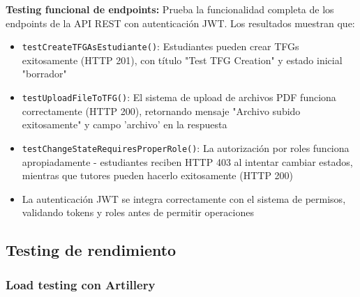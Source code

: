 \documentclass[12pt,a4paper,oneside]{report}
\begin{document}
\textbf{Testing funcional de endpoints:} Prueba la funcionalidad completa de los endpoints de la API REST con autenticación JWT. Los resultados muestran que:
\begin{itemize}
\item \texttt{testCreateTFGAsEstudiante()}: Estudiantes pueden crear TFGs exitosamente (HTTP 201), con título "Test TFG Creation" y estado inicial "borrador"
\item \texttt{testUploadFileToTFG()}: El sistema de upload de archivos PDF funciona correctamente (HTTP 200), retornando mensaje "Archivo subido exitosamente" y campo 'archivo' en la respuesta
\item \texttt{testChangeStateRequiresProperRole()}: La autorización por roles funciona apropiadamente - estudiantes reciben HTTP 403 al intentar cambiar estados, mientras que tutores pueden hacerlo exitosamente (HTTP 200)
\item La autenticación JWT se integra correctamente con el sistema de permisos, validando tokens y roles antes de permitir operaciones
\end{itemize}

\subsection{Testing de rendimiento}\label{testing-de-rendimiento}

\subsubsection{Load testing con
Artillery}\label{load-testing-con-artillery}
\end{document}
